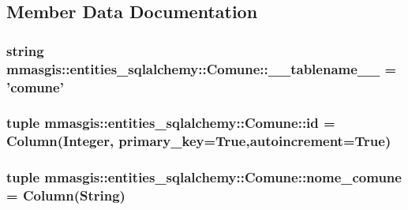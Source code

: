 \subsection{Member Data Documentation}
\hypertarget{classmmasgis_1_1entities__sqlalchemy_1_1Comune_a83933f27aa90ad0c17c049c7364c8a96}{
\subsubsection[{\_\-\_\-tablename\_\-\_\-}]{\setlength{\rightskip}{0pt plus 5cm}string {\bf mmasgis::entities\_\-sqlalchemy::Comune::\_\-\_\-tablename\_\-\_\-} = 'comune'}}
\label{classmmasgis_1_1entities__sqlalchemy_1_1Comune_a83933f27aa90ad0c17c049c7364c8a96}
\hypertarget{classmmasgis_1_1entities__sqlalchemy_1_1Comune_a50923f20833709501573592b19acd6f3}{
\subsubsection[{id}]{\setlength{\rightskip}{0pt plus 5cm}tuple {\bf mmasgis::entities\_\-sqlalchemy::Comune::id} = Column(Integer, primary\_\-key=True,autoincrement=True)}}
\label{classmmasgis_1_1entities__sqlalchemy_1_1Comune_a50923f20833709501573592b19acd6f3}
\hypertarget{classmmasgis_1_1entities__sqlalchemy_1_1Comune_a4172bd3523a11386f4e3fa72e99b1fb4}{
\subsubsection[{nome\_\-comune}]{\setlength{\rightskip}{0pt plus 5cm}tuple {\bf mmasgis::entities\_\-sqlalchemy::Comune::nome\_\-comune} = Column(String)}}
